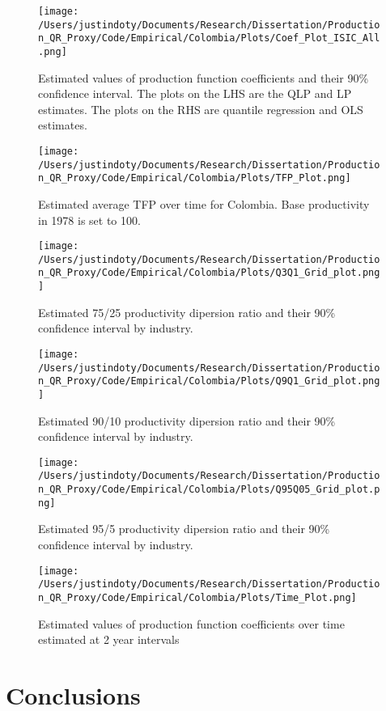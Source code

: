 \documentclass[11pt]{article}
\begin{document}
\begin{figure}[H]
\centering
\texttt{[image: /Users/justindoty/Documents/Research/Dissertation/Production\_QR\_Proxy/Code/Empirical/Colombia/Plots/Coef\_Plot\_ISIC\_All.png]}
\caption{Estimated values of production function coefficients and their 90\% confidence interval. The plots on the LHS are the QLP and LP estimates. The plots on the RHS are quantile regression and OLS estimates.}
\end{figure}

\begin{figure}[H]
\centering
\texttt{[image: /Users/justindoty/Documents/Research/Dissertation/Production\_QR\_Proxy/Code/Empirical/Colombia/Plots/TFP\_Plot.png]}
\caption{Estimated average TFP over time for Colombia. Base productivity in 1978 is set to 100.}
\end{figure}

\begin{figure}[H]
\centering
\texttt{[image: /Users/justindoty/Documents/Research/Dissertation/Production\_QR\_Proxy/Code/Empirical/Colombia/Plots/Q3Q1\_Grid\_plot.png]}
\caption{Estimated 75/25 productivity dipersion ratio and their 90\% confidence interval by industry.}
\end{figure}

\begin{figure}[H]
\centering
\texttt{[image: /Users/justindoty/Documents/Research/Dissertation/Production\_QR\_Proxy/Code/Empirical/Colombia/Plots/Q9Q1\_Grid\_plot.png]}
\caption{Estimated 90/10 productivity dipersion ratio and their 90\% confidence interval by industry.}
\end{figure}

\begin{figure}[H]
\centering
\texttt{[image: /Users/justindoty/Documents/Research/Dissertation/Production\_QR\_Proxy/Code/Empirical/Colombia/Plots/Q95Q05\_Grid\_plot.png]}
\caption{Estimated 95/5 productivity dipersion ratio and their 90\% confidence interval by industry.}
\end{figure}

\begin{figure}[H]
\centering
\texttt{[image: /Users/justindoty/Documents/Research/Dissertation/Production\_QR\_Proxy/Code/Empirical/Colombia/Plots/Time\_Plot.png]}
\caption{Estimated values of production function coefficients over time estimated at 2 year intervals}
\end{figure}

\section{Conclusions} \label{conclusion}
\end{document}
